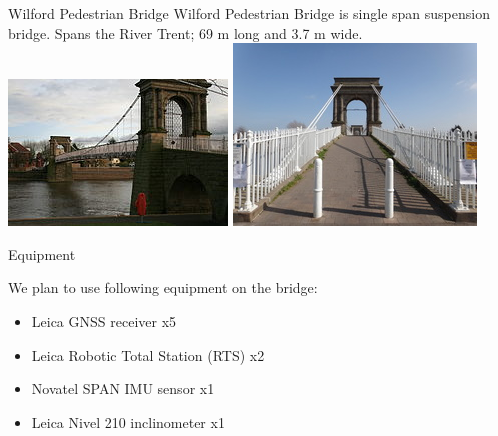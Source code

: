\documentclass[11pt]{beamer}
\begin{document}
\begin{frame}{Wilford Pedestrian Bridge}
Wilford Pedestrian Bridge is single span suspension bridge. Spans the River Trent; 69 m long and 3.7 m wide.
	\includegraphics[width=.6\textwidth]{pic/Bridge01.jpg}
	\includegraphics[width=.55\textwidth]{pic/Bridge02.jpg} 

\end{frame}

\begin{frame}{Equipment}

We plan to use following equipment on the bridge:

\begin{itemize}
	\item Leica GNSS receiver x5
	\item Leica Robotic Total Station (RTS) x2
	\item Novatel SPAN IMU sensor x1
	\item Leica Nivel 210 inclinometer x1
\end{itemize}

\end{frame}


\end{document}
